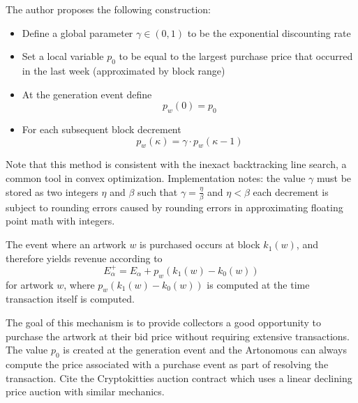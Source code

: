 \documentclass[11pt]{amsart}
\begin{document}
The author proposes the following construction:
\begin{itemize}
\item Define a global parameter $\gamma \in (0,1)$ to be the exponential discounting rate
\item Set a local variable $p_0$ to be equal to the largest purchase price that occurred in the last week (approximated by block range)
\item At the generation event define 
\[ p_w(0) = p_0\]
\item For each subsequent block decrement 
\[ p_w(\kappa) = \gamma \cdot p_w(\kappa-1) \]
\end{itemize}

Note that this method is consistent with the inexact backtracking line search, a common tool in convex optimization. Implementation notes: the value $\gamma$ must be stored as two integers $\eta$ and $\beta$ such that $\gamma = \frac{\eta}{\beta}$ and $\eta<\beta$ each decrement is subject to rounding errors caused by rounding errors in approximating floating point math with integers.

The event where an artwork $w$ is purchased occurs at block $k_1(w)$, and therefore yields revenue according to
\begin{equation}
E_\alpha^+ = E_\alpha + p_w\left(k_1(w)-k_0(w)\right) \label{rev}
\end{equation}
for artwork $w$, where $p_w\left(k_1(w)-k_0(w)\right)$ is computed at the time transaction itself is computed.

The goal of this mechanism is to provide collectors a good opportunity to purchase the artwork at their bid price without requiring extensive transactions. The value $p_0$ is created at the generation event and the Artonomous can always compute the price associated with a purchase event as part of resolving the transaction. Cite the Cryptokitties auction contract which uses a linear declining price auction with similar mechanics.
\end{document}
